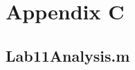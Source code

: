 \chapter{Appendix C} \label{cp:scripts}

\section{Lab11Analysis.m} \label{sec:analysis_script}

\inputminted{matlab}{Code/Lab11Analysis.m} \label{listing:analysis_script}